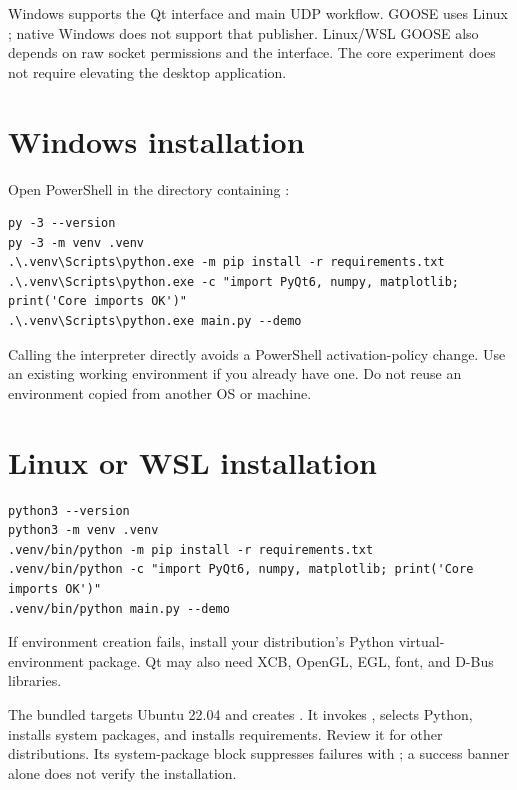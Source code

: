 Windows supports the Qt interface and main UDP workflow. GOOSE uses Linux ; native Windows does not support that publisher. Linux/WSL GOOSE also depends on raw socket permissions and the interface. The core experiment does not require elevating the desktop application.

\section*{Windows installation}
\par\noindent\begin{minipage}{\linewidth}
Open PowerShell in the directory containing :
\begin{lstlisting}[title={POWERSHELL}]
py -3 --version
py -3 -m venv .venv
.\.venv\Scripts\python.exe -m pip install -r requirements.txt
.\.venv\Scripts\python.exe -c "import PyQt6, numpy, matplotlib; print('Core imports OK')"
.\.venv\Scripts\python.exe main.py --demo
\end{lstlisting}
\end{minipage}\par
Calling the interpreter directly avoids a PowerShell activation-policy change. Use an existing working environment if you already have one. Do not reuse an environment copied from another OS or machine.

\section*{Linux or WSL installation}
\par\noindent\begin{minipage}{\linewidth}
\begin{lstlisting}[title={BASH}]
python3 --version
python3 -m venv .venv
.venv/bin/python -m pip install -r requirements.txt
.venv/bin/python -c "import PyQt6, numpy, matplotlib; print('Core imports OK')"
.venv/bin/python main.py --demo
\end{lstlisting}
\end{minipage}\par
If environment creation fails, install your distribution's Python virtual-environment package. Qt may also need XCB, OpenGL, EGL, font, and D-Bus libraries.

The bundled  targets Ubuntu 22.04 and creates . It invokes , selects Python, installs system packages, and installs requirements. Review it for other distributions. Its system-package block suppresses failures with ; a success banner alone does not verify the installation.

